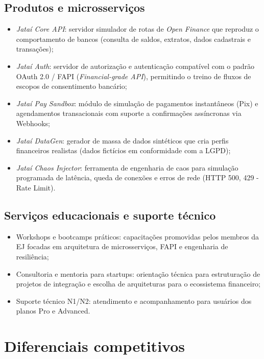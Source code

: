\documentclass[
  12pt,
  openright,
  oneside,
  a4paper,
  brazilian
]{abntex2}
\newcommand{\openfinance}{\textit{Open Finance}}
\begin{document}
\subsection{Produtos e microsserviços}
\begin{itemize}
    \item{\textit{Jataí Core API}:} servidor simulador de rotas de \openfinance{} que reproduz o comportamento de bancos (consulta de saldos, extratos, dados cadastrais e transações);
    \item{\textit{Jataí Auth}:} servidor de autorização e autenticação compatível com o padrão OAuth 2.0 / FAPI (\textit{Financial-grade API}), permitindo o treino de fluxos de escopos de consentimento bancário;
    \item{\textit{Jataí Pay Sandbox}:} módulo de simulação de pagamentos instantâneos (Pix) e agendamentos transacionais com suporte a confirmações assíncronas via Webhooks;
    \item{\textit{Jataí DataGen}:} gerador de massa de dados sintéticos que cria perfis financeiros realistas (dados fictícios em conformidade com a LGPD);
    \item{\textit{Jataí Chaos Injector}:} ferramenta de engenharia de caos para simulação programada de latência, queda de conexões e erros de rede (HTTP 500, 429 - Rate Limit).
\end{itemize}

\subsection{Serviços educacionais e suporte técnico}
\begin{itemize}
    \item{Workshops e bootcamps práticos:} capacitações promovidas pelos membros da EJ focadas em arquitetura de microsserviços, FAPI e engenharia de resiliência;
    \item{Consultoria e mentoria para startups:} orientação técnica para estruturação de projetos de integração e escolha de arquiteturas para o ecossistema financeiro;
    \item{Suporte técnico N1/N2:} atendimento e acompanhamento para usuários dos planos Pro e Advanced.
\end{itemize}

\section{Diferenciais competitivos}
\label{sec:diferenciais_empresa}
\end{document}
